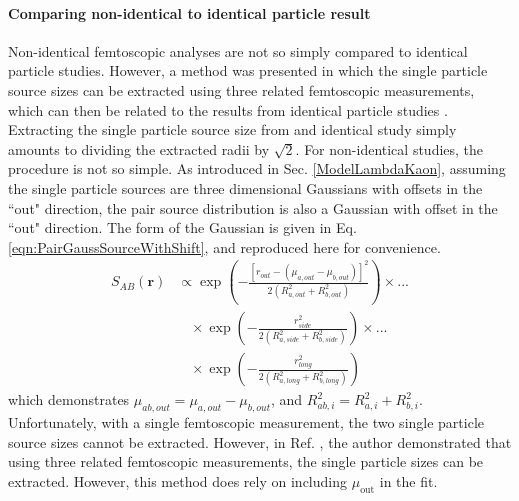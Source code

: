 \documentclass[/home/jesse/Analysis/FemtoAnalysis/AnalysisNotes/AnalysisNoteJBuxton.tex]{subfiles}
\begin{document}
\paragraph*{Comparing non-identical to identical particle result}
Non-identical femtoscopic analyses are not so simply compared to identical particle studies.
However, a method was presented in which the single particle source sizes can be extracted using three related femtoscopic measurements, which can then be related to the results from identical particle studies \cite{Kisiel:2009eh}.
Extracting the single particle source size from and identical study simply amounts to dividing the extracted radii by $\sqrt{2}$.
For non-identical studies, the procedure is not so simple.
As introduced in Sec. \ref{ModelLambdaKaon}, assuming the single particle sources are three dimensional Gaussians with offsets in the ``out" direction, the pair source distribution is also a Gaussian with offset in the ``out" direction.
The form of the Gaussian is given in Eq. \ref{eqn:PairGaussSourceWithShift}, and reproduced here for convenience.
\begin{equation}
\begin{aligned}
S_{AB}(\mathbf{r}) &\propto \exp\left(-\frac{[r_{out}-(\mu_{a, out}-\mu_{b, out})]^{2}}{2(R_{a,out}^{2}+R_{b,out}^{2})}\right) \times ... \\
&~~~~\times \exp\left(-\frac{r_{side}^{2}}{2(R_{a,side}^{2}+R_{b,side}^{2})}\right) \times ... \\
&~~~~\times \exp\left(-\frac{r_{long}^{2}}{2(R_{a,long}^{2}+R_{b,long}^{2})}\right)
\end{aligned}
\label{eqn:PairGaussSourceWithShiftv2}
\end{equation}
which demonstrates $\mu_{ab, out} = \mu_{a, out}-\mu_{b, out}$, and $R_{ab, i}^{2} = R_{a, i}^{2} + R_{b, i}^{2}$.
Unfortunately, with a single femtoscopic measurement, the two single particle source sizes cannot be extracted.
However, in Ref. \cite{Kisiel:2009eh}, the author demonstrated that using three related femtoscopic measurements, the single particle sizes can be extracted.
However, this method does rely on including $\mu_{\mathrm{out}}$ in the fit.
\end{document}
